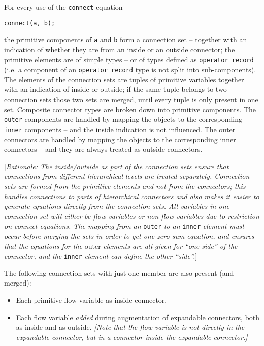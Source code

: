 For every use of the \lstinline!connect!-equation
\begin{lstlisting}[language=modelica]
connect(a, b);
\end{lstlisting}

the primitive components of \lstinline!a! and \lstinline!b! form a connection set -- together
with an indication of whether they are from an inside or an outside
connector; the primitive elements are of simple types -- or of types
defined as \lstinline!operator record! (i.e. a component of an \lstinline!operator record! type
is not split into sub-components). The elements of the connection sets
are tuples of primitive variables together with an indication of inside
or outside; if the same tuple belongs to two connection sets those two
sets are merged, until every tuple is only present in one set. Composite
connector types are broken down into primitive components. The \lstinline!outer!
components are handled by mapping the objects to the corresponding \lstinline!inner!
components -- and the inside indication is not influenced. The outer
connectors are handled by mapping the objects to the corresponding inner
connectors -- and they are always treated as outside connectors.

{[}\emph{Rationale: The inside/outside as part of the connection sets
ensure that connections from different hierarchical levels are treated
separately. Connection sets are formed from the primitive elements and
not from the connectors; this handles connections to parts of
hierarchical connectors and also makes it easier to generate equations
directly from the connection sets. All variables in one connection set
will either be flow variables or non-flow variables due to restriction
on connect-equations. The mapping from an} \lstinline!outer! \emph{to an} \lstinline!inner!
\emph{element must occur before merging the sets in order to get one
zero-sum equation, and ensures that the equations for the} outer
\emph{elements are all given for ``one side'' of the connector, and the}
\lstinline!inner! \emph{element can define the other ``side''.}{]}

The following connection sets with just one member are also present (and
merged):

\begin{itemize}
\item
  Each primitive flow-variable as inside connector.
\item
  Each flow variable \emph{added} during augmentation of expandable
  connectors, both as inside and as outside. \emph{{[}Note that the flow
  variable is not directly in the expandable connector, but in a
  connector inside the expandable connector.{]}}
\end{itemize}

